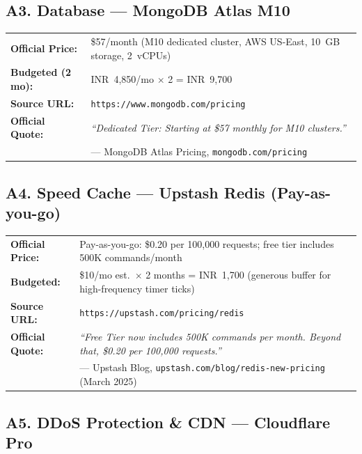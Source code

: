 \documentclass[11pt, a4paper]{article}
\begin{document}
\subsection*{A3. Database --- MongoDB Atlas M10}

\begin{tcolorbox}[greenbox, title={MongoDB Atlas M10 Dedicated Cluster --- Official Pricing}]
\begin{tabularx}{\linewidth}{@{}>{\bfseries}l X@{}}
Official Price:  & \$57/month (M10 dedicated cluster, AWS US-East, 10~GB storage, 2~vCPUs) \\
Budgeted (2 mo): & INR~4,850/mo $\times$ 2 = INR~9,700 \\
Source URL:      & \texttt{https://www.mongodb.com/pricing} \\
Official Quote:  & \textit{``Dedicated Tier: Starting at \$57 monthly for M10 clusters.''} \\
                 & --- MongoDB Atlas Pricing, \texttt{mongodb.com/pricing} \\
\end{tabularx}
\end{tcolorbox}

\subsection*{A4. Speed Cache --- Upstash Redis (Pay-as-you-go)}

\begin{tcolorbox}[greenbox, title={Upstash Redis --- Official Pricing}]
\begin{tabularx}{\linewidth}{@{}>{\bfseries}l X@{}}
Official Price:  & Pay-as-you-go: \$0.20 per 100,000 requests; free tier includes 500K commands/month \\
Budgeted:        & \$10/mo est.\ $\times$ 2 months = INR~1,700 (generous buffer for high-frequency timer ticks) \\
Source URL:      & \texttt{https://upstash.com/pricing/redis} \\
Official Quote:  & \textit{``Free Tier now includes 500K commands per month. Beyond that, \$0.20 per 100,000 requests.''} \\
                 & --- Upstash Blog, \texttt{upstash.com/blog/redis-new-pricing} (March 2025) \\
\end{tabularx}
\end{tcolorbox}

\subsection*{A5. DDoS Protection \& CDN --- Cloudflare Pro}
\end{document}
